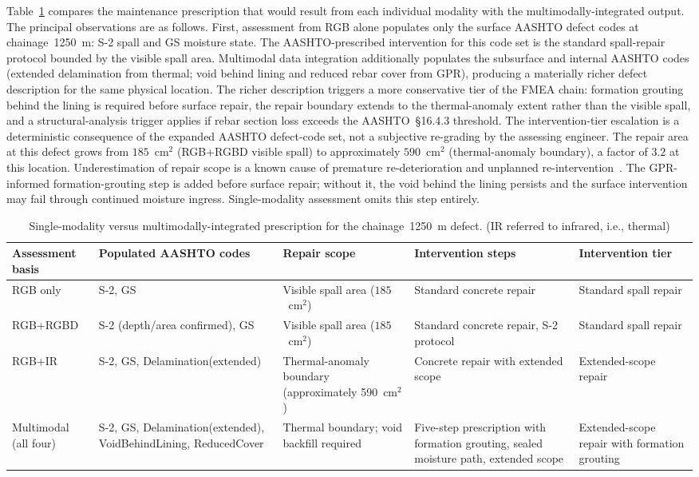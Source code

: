\documentclass[11pt,a4paper]{article}
\begin{document}
Table~\ref{tab:comparison} compares the maintenance prescription that would result from each individual modality with the multimodally-integrated output. The principal observations are as follows. First, assessment from RGB alone populates only the surface AASHTO defect codes at chainage~1250~m: S-2 spall and GS moisture state. The AASHTO-prescribed intervention for this code set is the standard spall-repair protocol bounded by the visible spall area. Multimodal data integration additionally populates the subsurface and internal AASHTO codes (extended delamination from thermal; void behind lining and reduced rebar cover from GPR), producing a materially richer defect description for the same physical location. The richer description triggers a more conservative tier of the FMEA chain: formation grouting behind the lining is required before surface repair, the repair boundary extends to the thermal-anomaly extent rather than the visible spall, and a structural-analysis trigger applies if rebar section loss exceeds the AASHTO~\S16.4.3 threshold. The intervention-tier escalation is a deterministic consequence of the expanded AASHTO defect-code set, not a subjective re-grading by the assessing engineer. The repair area at this defect grows from $185$~cm$^2$ (RGB+RGBD visible spall) to approximately $590$~cm$^2$ (thermal-anomaly boundary), a factor of $3.2$ at this location. Underestimation of repair scope is a known cause of premature re-deterioration and unplanned re-intervention~\citep{Watase2015}. The GPR-informed formation-grouting step is added before surface repair; without it, the void behind the lining persists and the surface intervention may fail through continued moisture ingress. Single-modality assessment omits this step entirely.

\begin{table}[htbp]
\centering
\caption{Single-modality versus multimodally-integrated prescription for the
  chainage~1250~m defect. (IR referred to infrared, i.e., thermal)}
\label{tab:comparison}
\begin{tabularx}{\textwidth}{p{2.0cm} X X X p{2.4cm}}
\toprule
\textbf{Assessment basis} & \textbf{Populated AASHTO codes} &
  \textbf{Repair scope} & \textbf{Intervention steps} &
  \textbf{Intervention tier} \\
\midrule
RGB only & S-2, GS & Visible spall area
  ($185$~cm$^2$) & Standard concrete repair &
  Standard spall repair \\
RGB+RGBD & S-2 (depth/area confirmed), GS & Visible spall area
  ($185$~cm$^2$) & Standard concrete repair, S-2 protocol &
  Standard spall repair \\
RGB+IR & S-2, GS, Delamination(extended) & Thermal-anomaly
  boundary (approximately 590~cm$^2$) & Concrete repair with
  extended scope & Extended-scope repair \\
Multimodal (all four) & S-2, GS, Delamination(extended),
  VoidBehindLining, ReducedCover & Thermal boundary;
  void backfill required &
  Five-step prescription with formation grouting, sealed moisture
  path, extended scope & Extended-scope repair with
  formation grouting \\
\bottomrule
\end{tabularx}
\end{table}
\end{document}

